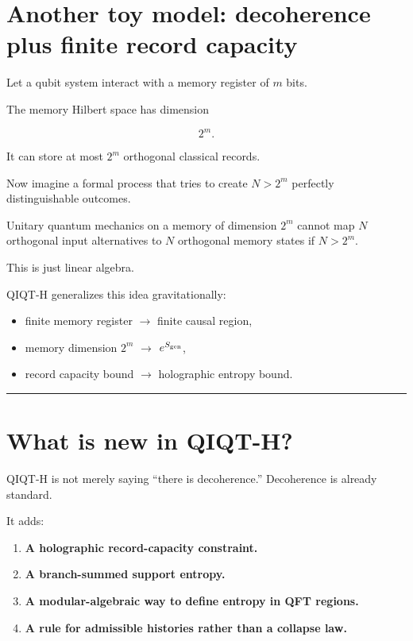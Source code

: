 \documentclass[11pt,a4paper]{article}
\begin{document}
\section{Another toy model: decoherence plus finite record capacity}

Let a qubit system interact with a memory register of $m$ bits.

The memory Hilbert space has dimension

\[
2^m.
\]

It can store at most $2^m$ orthogonal classical records.

Now imagine a formal process that tries to create $N>2^m$ perfectly distinguishable outcomes.

Unitary quantum mechanics on a memory of dimension $2^m$ cannot map $N$ orthogonal input alternatives to $N$ orthogonal memory states if $N>2^m$.

This is just linear algebra.

QIQT-H generalizes this idea gravitationally:

\begin{itemize}
  \item finite memory register $\rightarrow$ finite causal region,
  \item memory dimension $2^m$ $\rightarrow$ $e^{S_{\rm gen}}$,
  \item record capacity bound $\rightarrow$ holographic entropy bound.
\end{itemize}

\medskip\hrule\medskip

\section{What is new in QIQT-H?}

QIQT-H is not merely saying “there is decoherence.” Decoherence is already standard.

It adds:

\begin{enumerate}
  \item \textbf{A holographic record-capacity constraint.}
  \item \textbf{A branch-summed support entropy.}
  \item \textbf{A modular-algebraic way to define entropy in QFT regions.}
  \item \textbf{A rule for admissible histories rather than a collapse law.}
\end{enumerate}
\end{document}
